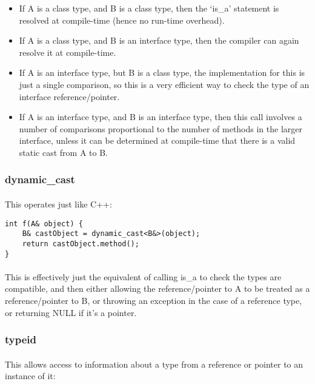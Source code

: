 \documentclass[12pt,twoside,notitlepage]{report}
\begin{document}
\begin{itemize}
\item If A is a class type, and B is a class type, then the `is\_a' statement is resolved at compile-time (hence no run-time overhead).
\item If A is a class type, and B is an interface type, then the compiler can again resolve it at compile-time.
\item If A is an interface type, but B is a class type, the implementation for this is just a single comparison, so this is a very efficient way to check the type of an interface reference/pointer.
\item If A is an interface type, and B is an interface type, then this call involves a number of comparisons proportional to the number of methods in the larger interface, unless it can be determined at compile-time that there is a valid static cast from A to B.
\end{itemize}

\subsubsection{dynamic\_cast}

\paragraph{}
This operates just like C++:

\begin{lstlisting}
int f(A& object) {
	B& castObject = dynamic_cast<B&>(object);
	return castObject.method();
}
\end{lstlisting}

\paragraph{}
This is effectively just the equivalent of calling is\_a to check the types are compatible, and then either allowing the reference/pointer to A to be treated as a reference/pointer to B, or throwing an exception in the case of a reference type, or returning NULL if it's a pointer.

\subsubsection{typeid}

\paragraph{}
This allows access to information about a type from a reference or pointer to an instance of it:
\end{document}
